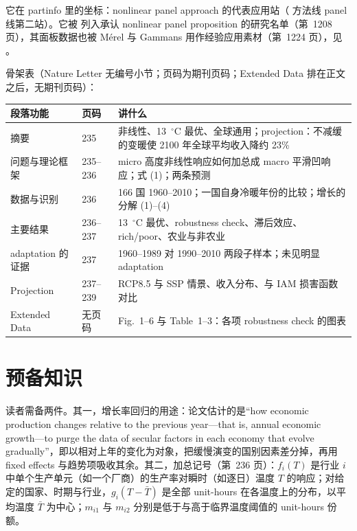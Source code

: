 它在 partinfo 里的坐标：nonlinear panel approach 的代表应用站（ 方法线 panel 线第二站）。它被 \citet{merel2021climate} 列入承认 nonlinear panel proposition 的研究名单（第~1208 页），其面板数据也被 Mérel 与 Gammans 用作经验应用素材（第~1224 页），见 。

骨架表（Nature Letter 无编号小节；页码为期刊页码；Extended Data 排在正文之后，无期刊页码）：

\begin{table}[htbp]
\centering\small
\begin{tabular}{@{}p{3.4cm}p{1.4cm}p{8.0cm}@{}}
\toprule
段落功能 & 页码 & 讲什么 \\
\midrule
摘要 & 235 & 非线性、13~$^\circ$C 最优、全球通用；projection：不减缓的变暖使 2100 年全球平均收入降约 23\% \\
问题与理论框架 & 235--236 & micro 高度非线性响应如何加总成 macro 平滑凹响应；式 (1)；两条预测 \\
数据与识别 & 236 & 166 国 1960--2010；一国自身冷暖年份的比较；增长的分解 (1)--(4) \\
主要结果 & 236--237 & 13~$^\circ$C 最优、robustness check、滞后效应、rich/poor、农业与非农业 \\
adaptation 的证据 & 237 & 1960--1989 对 1990--2010 两段子样本；未见明显 adaptation \\
Projection & 237--239 & RCP8.5 与 SSP 情景、收入分布、与 IAM 损害函数对比 \\
Extended Data & 无页码 & Fig.~1--6 与 Table~1--3：各项 robustness check 的图表 \\
\bottomrule
\end{tabular}
\end{table}

\section{预备知识}

读者需备两件。其一，增长率回归的用途：论文估计的是``how economic production changes relative to the previous year—that is, annual economic growth—to purge the data of secular factors in each economy that evolve gradually''\citep[第~236 页]{burke2015global}，即以相对上年的变化为对象，把缓慢演变的国别因素差分掉，再用 fixed effects 与趋势项吸收其余。其二，加总记号（第~236 页）：$f_i(T)$ 是行业 $i$ 中单个生产单元（如一个厂商）的生产率对瞬时（如逐日）温度 $T$ 的响应；对给定的国家、时期与行业，$g_i(T-\bar{T})$ 是全部 unit-hours 在各温度上的分布，以平均温度 $\bar{T}$ 为中心；$m_{i1}$ 与 $m_{i2}$ 分别是低于与高于临界温度阈值的 unit-hours 份额。

